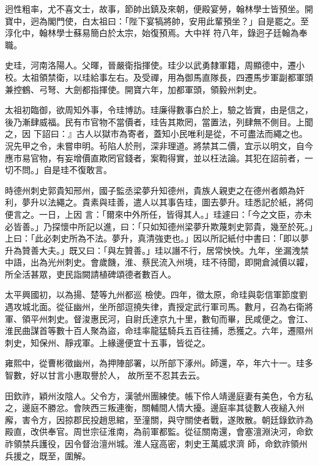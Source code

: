 \begin{pinyinscope}
 迥性粗率，尤不喜文士，故事，節帥出鎮及來朝，便殿宴勞，翰林學士皆預坐。開寶中，迥為閣門使，白太祖曰：「陛下宴犒將帥，安用此輩預坐？」自是罷之。至淳化中，翰林學士蘇易簡白於太宗，始復預焉。大中祥
 符八年，錄迥子廷翰為奉職。



 史珪，河南洛陽人。父暉，晉嚴衛指揮使。珪少以武勇隸軍籍，周顯德中，遷小校。太祖領禁衛，以珪給事左右。及受禪，用為御馬直隊長，四遷馬步軍副都軍頭兼控鶴、弓弩、大劍都指揮使。開寶六年，加都軍頭，領毅州刺史。



 太祖初臨御，欲周知外事，令珪博訪。珪廉得數事白於上，驗之皆實，由是信之，後乃漸肆威福。民有市官物不當價者，珪告其欺罔，當置法，列肆無不側目。上聞之，因
 下詔曰：』古人以獄市為寄者，蓋知小民唯利是從，不可盡法而繩之也。況先甲之令，未嘗申明。茍陷人於刑，深非理道。將禁其二價，宜示以明文，自今應市易官物，有妄增價直欺罔官錢者，案鞫得實，並以枉法論。其犯在詔前者，一切不問。」自是珪不復敢言。



 時德州刺史郭貴知邢州，國子監丞梁夢升知德州，貴族人親吏之在德州者頗為奸利，夢升以法繩之。貴素與珪善，遣人以其事告珪，圖去夢升。珪悉記於紙，將伺便言之。一日，上因
 言：「爾來中外所任，皆得其人。」珪遽曰：「今之文臣，亦未必皆善。」乃探懷中所記以進，曰：「只如知德州梁夢升欺蔑刺史郭貴，幾至於死。」上曰：「此必刺史所為不法。夢升，真清強吏也。」因以所記紙付中書曰：「即以夢升為贊善大夫。」既又曰：「與左贊善。」珪以譖不行，居常怏怏。九年，坐漏洩禁中語，出為光州刺史。會歲饑，淮、蔡民流入州境，珪不待聞，即開倉減價以糶，所全活甚眾，吏民詣闕請植碑頌德者數百人。



 太平興國初，以為揚、楚等九州都巡
 檢使。四年，徵太原，命珪與彰信軍節度劉遇攻城北面。從征幽州，坐所部逗撓失律，責授定武行軍司馬。數月，召為右衛將軍、領平州刺史。督浚惠民河，自尉氏達京九十里，數旬而畢，民咸便之。會江、淮民曲謀首等數十百人聚為盜，命珪率龍猛騎兵五百往捕，悉獲之。六年，遷隰州刺史，知保州、靜戎軍。上緣邊便宜十五事，皆從之。



 雍熙中，從曹彬徵幽州，為押陣部署，以所部下涿州。師還，卒，年六十一。珪多智數，好以甘言小惠取譽於人，
 故所至不忍其去云。



 田欽祚，穎州汝陰人。父令方，漢虢州團練使。帳下伶人靖邊庭妻有美色，令方私之，邊庭不勝忿。會陜西三叛連衡，關輔間人情大擾。邊庭率其徒數人夜縋入州廨，害令方，因掠郡民投趙思綰，至潼關，與守關使者戰，遂敗散。朝廷錄欽祚為殿直，改供奉官。周世宗征淮南，為前軍都監。從征關南還，會塞澶淵決河，命欽祚領禁兵護役，因令督治澶州城。淮人寇高密，刺史王萬威求濟
 師，命欽祚領州兵援之，既至，圍解。




\end{pinyinscope}
